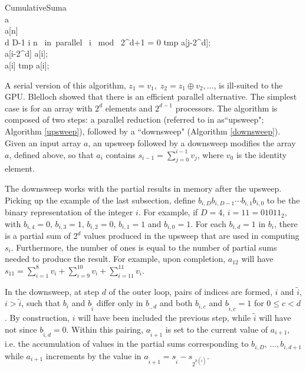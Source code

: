 \begin{pseudocode}[ruled]{CumulativeSum}{a}
\label{downsweep}
\\
a \GETS {}\\
a[n] \\
\FOR d \GETS D-1  \DO \BEGIN
  \FOR i  \TO n \mbox{ in parallel }\DO \BEGIN
    \IF i \mbox{ mod } 2^{d+1} = 0 \DO \BEGIN
    tmp \GETS a[j-2^{d}];\\
    a[i-2^{d}] \GETS a[i];\\
    a[i] \GETS tmp \oplus a[i];
    \END \END \END
{}
\end{pseudocode}

A serial version of this algorithm, $z_1 = v_1,\;z_2 = z_1 \oplus v_2,\dots$, is ill-suited to the GPU. Blelloch showed that there is an efficient parallel alternative. The simplest case is for an array with $2^d$ elements and $2^{d-1}$ processors. The algorithm is composed of two steps: a parallel reduction (referred to in \cite{blelloch1990} as``upsweep"; Algorithm \ref{upsweep}), followed by a ``downsweep" (Algorithm \ref{downsweep}). Given an input array $a$, an upsweep followed by a downsweep modifies the array $a$, defined above, so that $a_i$ contains $s_{i-1}=\sum_{j=0}^{i-1}v_j$, where $v_0$ is the identity element.

The downsweep works with the partial results in memory after the upsweep. Picking up the example of the last subsection, define $b_{i,D}b_{i,D-1}\cdots b_{i,1}b_{i,0}$ to be the binary representation of the integer $i$. For example, if $D=4$, $i=11=01011_{2}$, with $b_{i,4}=0,\, b_{i,3}=1,\,b_{i,2}=0,\,b_{i,1}=1$ and $b_{i,0}=1$. For each $b_{i,d}=1$ in $b_i$, there is a partial sum of $2^d$ values produced in the upsweep that are used in computing $s_i$. Furthermore, the number of ones is equal to the number of partial sums needed to produce the result. For example, upon completion, $a_{12}$ will have $s_{11}=\sum_{i=1}^8 v_i + \sum_{i=9}^{10}v_i+\sum_{i=11}^{11}v_i$. 

In the downsweep, at step $d$ of the outer loop, pairs of indices are formed, $i$ and $\tilde{i}$, $i>\tilde{i}$, such that $b_i$ and $b_{\tilde{i}}$ differ only in $b_{.,d}$ and both $b_{i,c}$ and $b_{\tilde{i},c}=1$ for $0\le c<d$. By construction, $i$ will have been included the previous step, while $\tilde{i}$ will have not since $b_{\tilde{i},d}=0$. Within this pairing, $a_{\tilde{i}+1}$ is set to the current value of $a_{i+1}$, i.e. the accumulation of values in the partial sums corresponding to $b_{i,D},\, \ldots, b_{i,d+1}$ while $a_{i+1}$ increments by the value in $a_{\tilde{i}+1}=s_{\tilde{i}}-s_{2^{h(\tilde{i})}}$.

